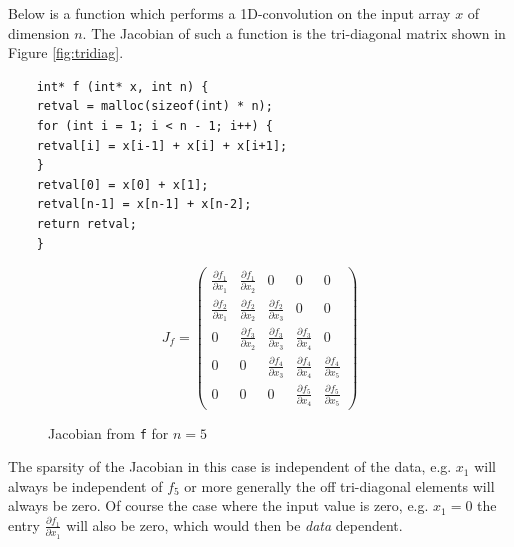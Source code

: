 	Below is a function which performs a 1D-convolution on the input array $x$ of
	dimension $n$. 
	The Jacobian of such a function is the tri-diagonal matrix shown in Figure
	\ref{fig:tridiag}. 
	\begin{verbatim}
	int* f (int* x, int n) {
	retval = malloc(sizeof(int) * n);
	for (int i = 1; i < n - 1; i++) {
	retval[i] = x[i-1] + x[i] + x[i+1];
	}
	retval[0] = x[0] + x[1];
	retval[n-1] = x[n-1] + x[n-2];
	return retval;
	}
	\end{verbatim}
	\begin{figure}[H]
		$$ J_{f} = \left(\begin{matrix}
		\frac{\partial f_1}{\partial x_1} & \frac{\partial f_1}{\partial x_2} & 0 & 0 &
		0 \\
		\frac{\partial f_2}{\partial x_1}& \frac{\partial f_2}{\partial x_2} &
		\frac{\partial f_2}{\partial x_3} & 0 & 0\\
		0 & \frac{\partial f_3}{\partial x_2} & \frac{\partial f_3}{\partial x_3} &
		\frac{\partial f_3}{\partial x_4} & 0\\
		0 & 0 & \frac{\partial f_4}{\partial x_3} & \frac{\partial f_4}{\partial x_4} &
		\frac{\partial f_4}{\partial x_5} \\
		0 & 0 & 0 & \frac{\partial f_5}{\partial x_4} & \frac{\partial f_5}{\partial
			x_5}
		\end{matrix}\right) $$
		\caption{Jacobian from \texttt{f} for $n=5$}
		
	\end{figure}
	The sparsity of the Jacobian in this case is independent of the data, e.g. $x_1$
	will always be independent of $f_5$ 
	or more generally the off tri-diagonal elements will always be zero. 
	Of course the case where the input value is zero, e.g. $x_1 = 0$  the entry
	$\frac{\partial f_1}{\partial x_1}$ will also be zero, which would then be
	\emph{data} dependent.
	
